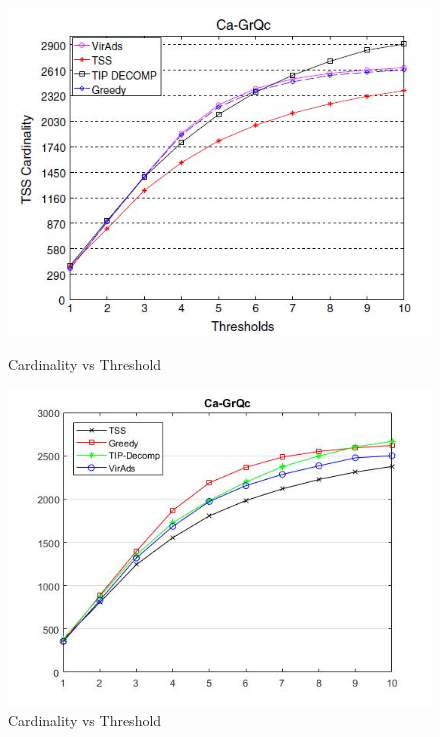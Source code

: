 \begin{figure}[h!]
\begin{minipage}[t]{0.50\textwidth}
\includegraphics[width=\linewidth,keepaspectratio=true]{images/ca-grqcpaper.jpg}
\caption{Cardinality vs Threshold}

\end{minipage}
\begin{minipage}[t]{0.50\textwidth}
\includegraphics[width=\linewidth,keepaspectratio=true]{images/ca-grqcresult.jpg}
\caption{Cardinality vs Threshold}
\end{minipage}
\end{figure}

